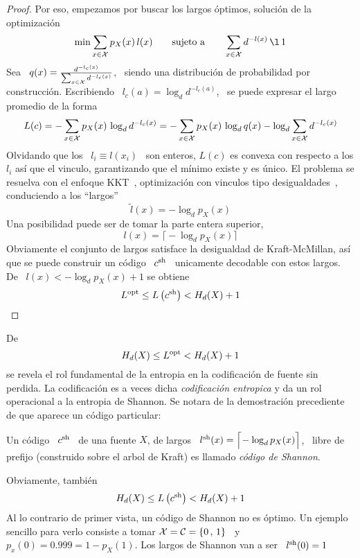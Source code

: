 \begin{proof}
  Por  eso,  empezamos  por  buscar  los  largos  \'optimos,  soluci\'on  de  la
  optimizaci\'on
  \[
  \min \sum_{x \in \X} p_X(x) \,  l(x) \qquad \mbox{sujeto a} \qquad \sum_{x \in
    \X} d^{-l(x)} \, \l \, 1
  \]
  Sea \ $q(x)  = \frac{d^{-l_c(x)}}{\sum_{x \in \mathcal{X}} d^{-l_c(x)}}$,  \ siendo una
  distribuci\'on de  probabilidad por  construcci\'on.  Escribiendo \  $l_c(a) =
  \log_d d^{-l_c(a)}$, \ se puede expresar el largo promedio de la forma
  \[
  L(c) =  - \sum_{x  \in \mathcal{X}}  p_X(x) \, \log_d  d^{-l_c(x)} =  - \sum_{x  \in \mathcal{X}}
  p_X(x) \, \log_d q(x) - \log_d \sum_{x \in \mathcal{X}} d^{-l_c(x)}
  \]
  Olvidando que  los \ $l_i \equiv l(x_i)$  \ son enteros, $L(c)$  es convexa con
  respecto a los $l_i$ as\'i que el vinculo, garantizando que el m\'inimo existe
  y    es    \'unico.    El    problema    se    resuelva    con   el    enfoque
  KKT~,      optimizaci\'on      con     vinculos      tipo
  desigualdades~\cite{Mil00, CamMar09}, conduciendo a los ``largos''
  \[
  \widetilde{l}(x) = - \log_d p_X(x)
  \]
  Una posibilidad puede ser de tomar la parte entera superior,
  \[
  l(x) = \Big\lceil\! - \log_d p_X(x) \Big\rceil
  \]
  Obviamente el  conjunto de largos satisface la  desigualdad de Kraft-McMillan,
  as\'i que se puede construir un  c\'odigo \ $c^{\mathrm{sh}}$ \ unicamente decodable con
  estos largos. De \ $l(x) < - \log_d p_X(x) + 1$ se obtiene
  \[
   L^{\mathrm{opt}} \le L\left( c^{\mathrm{sh}} \right) < H_d(X) + 1
  \]
\end{proof}
%
De  $$H_d(X) \le  L^{\mathrm{opt}} <  H_d(X) +  1$$  se revela  el rol  fundamental de  la
entropia en  la codificaci\'on  de fuente sin  perdida.  La codificaci\'on  es a
veces dicha {\it codificaci\'on entropica} y da un rol operacional a la entropia
de  Shannon. Se  notara  de la  demostraci\'on  precediente de  que aparece  un
c\'odigo particular:
%
\begin{definicion}
  Un c\'odigo \ $c^{\mathrm{sh}}$ \ de una  fuente $X$, de largos \ $l^{\mathrm{sh}}(x) = \Big\lceil\!
  - \log_d p_X(x) \Big\rceil$, \ libre  de prefijo (construido sobre el arbol de
  Kraft) es llamado {\it c\'odigo de Shannon}.
\end{definicion}
%
Obviamente, tambi\'en
%
\[
H_d(X) \le L\left( c^{\mathrm{sh}}  \right) < H_d(X) +  1
\]
%
Al lo  contrario de  primer vista, un  c\'odigo de  Shannon no es  \'optimo.  Un
ejemplo sencillo para verlo consiste a tomar $\mathcal{X} = \mathcal{C} = \{ 0 \, , \, 1 \}$ \ y \
$p_x(0) = 0.999 = 1 - p_X(1)$.  Los largos de Shannon van a ser \ $l^{\mathrm{sh}}(0) = 1$
